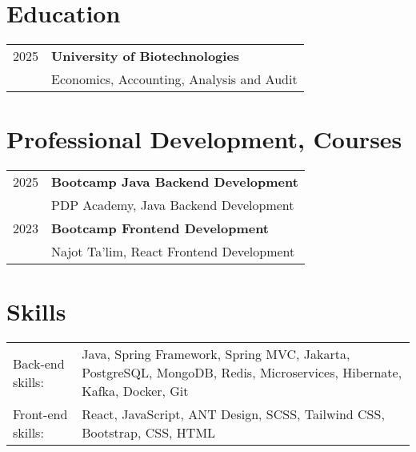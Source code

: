 \documentclass[a4paper,12pt]{article}
\begin{document}
\section{Education}
\begin{tabularx}{\linewidth}{@{}l X@{}}
2025 & \textbf{University of Biotechnologies} \\
     & Economics, Accounting, Analysis and Audit \\
\end{tabularx}

\vspace{1em}

\section{Professional Development, Courses}
\begin{tabularx}{\linewidth}{@{}l X@{}}
2025 & \textbf{Bootcamp Java Backend Development} \\
     & PDP Academy, Java Backend Development \\
2023 & \textbf{Bootcamp Frontend Development} \\
     & Najot Ta'lim, React Frontend Development \\
\end{tabularx}


\section{Skills}
\begin{tabularx}{\linewidth}{@{}l X@{}}
Back-end skills: &  \normalsize{Java, Spring Framework, Spring MVC, Jakarta, PostgreSQL, MongoDB, Redis, Microservices, Hibernate, Kafka, Docker, Git}\\
Front-end skills:  &  \normalsize{React, JavaScript, ANT Design, SCSS, Tailwind CSS, Bootstrap, CSS, HTML}\\  
\end{tabularx}

\vfill
{}
\end{document}
